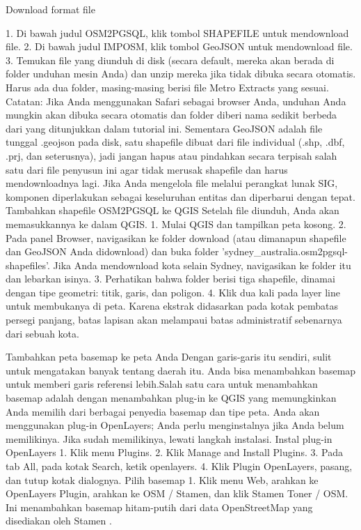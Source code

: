Download format file
 
1.	Di bawah judul OSM2PGSQL, klik tombol SHAPEFILE untuk mendownload file.
2.	Di bawah judul IMPOSM, klik tombol GeoJSON untuk mendownload file.
3.	Temukan file yang diunduh di disk (secara default, mereka akan berada di folder unduhan mesin Anda) dan unzip mereka jika tidak dibuka secara otomatis. Harus ada dua folder, masing-masing berisi file Metro Extracts yang sesuai.
Catatan: Jika Anda menggunakan Safari sebagai browser Anda, unduhan Anda mungkin akan dibuka secara otomatis dan folder diberi nama sedikit berbeda dari yang ditunjukkan dalam tutorial ini.
Sementara GeoJSON adalah file tunggal .geojson pada disk, satu shapefile dibuat dari file individual (.shp, .dbf, .prj, dan seterusnya), jadi jangan hapus atau pindahkan secara terpisah salah satu dari file penyusun ini agar tidak merusak shapefile dan harus mendownloadnya lagi. Jika Anda mengelola file melalui perangkat lunak SIG, komponen diperlakukan sebagai keseluruhan entitas dan diperbarui dengan tepat.
Tambahkan shapefile OSM2PGSQL ke QGIS
Setelah file diunduh, Anda akan memasukkannya ke dalam QGIS.
1.	Mulai QGIS dan tampilkan peta kosong.
2.	Pada panel Browser, navigasikan ke folder download (atau dimanapun shapefile dan GeoJSON Anda didownload) dan buka folder 'sydney_australia.osm2pgsql-shapefiles'. Jika Anda mendownload kota selain Sydney, navigasikan ke folder itu dan lebarkan isinya.
3.	Perhatikan bahwa folder berisi tiga shapefile, dinamai dengan tipe geometri: titik, garis, dan poligon.
4.	Klik dua kali pada layer line untuk membukanya di peta. Karena ekstrak didasarkan pada kotak pembatas persegi panjang, batas lapisan akan melampaui batas administratif sebenarnya dari sebuah kota.
 
Tambahkan peta basemap ke peta Anda
Dengan garis-garis itu sendiri, sulit untuk mengatakan banyak tentang daerah itu. Anda bisa menambahkan basemap untuk memberi garis referensi lebih.Salah satu cara untuk menambahkan basemap adalah dengan menambahkan plug-in ke QGIS yang memungkinkan Anda memilih dari berbagai penyedia basemap dan tipe peta. Anda akan menggunakan plug-in OpenLayers; Anda perlu menginstalnya jika Anda belum memilikinya. Jika sudah memilikinya, lewati langkah instalasi.
Instal plug-in OpenLayers
1.	Klik menu Plugins.
2.	Klik Manage and Install Plugins.
3.	Pada tab All, pada kotak Search, ketik openlayers.
4.	Klik Plugin OpenLayers, pasang, dan tutup kotak dialognya.
Pilih basemap
1.	Klik menu Web, arahkan ke OpenLayers Plugin, arahkan ke OSM / Stamen, dan klik Stamen Toner / OSM. Ini menambahkan basemap hitam-putih dari data OpenStreetMap yang disediakan oleh Stamen .
 
